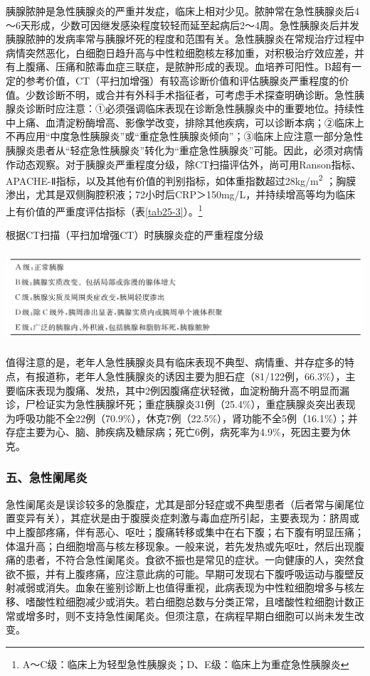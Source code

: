 胰腺脓肿是急性胰腺炎的严重并发症，临床上相对少见。脓肿常在急性胰腺炎后4～6天形成，少数可因继发感染程度较轻而延至起病后2～4周。急性胰腺炎后并发胰腺脓肿的发病率常与胰腺坏死的程度和范围有关。急性胰腺炎在常规治疗过程中病情突然恶化，白细胞日趋升高与中性粒细胞核左移加重，对积极治疗效应差，并有上腹痛、压痛和脓毒血症三联症，是脓肿形成的表现。血培养可阳性。B超有一定的参考价值，CT（平扫加增强）有较高诊断价值和评估胰腺炎严重程度的价值。少数诊断不明，或合并有外科手术指征者，可考虑手术探查明确诊断。急性胰腺炎诊断时应注意：①必须强调临床表现在诊断急性胰腺炎中的重要地位。持续性中上痛、血清淀粉酶增高、影像学改变，排除其他疾病，可以诊断本病；②临床上不再应用“中度急性胰腺炎”或“重症急性胰腺炎倾向”；③临床上应注意一部分急性胰腺炎患者从“轻症急性胰腺炎”转化为“重症急性胰腺炎”可能。因此，必须对病情作动态观察。对于胰腺炎严重程度分级，除CT扫描评估外，尚可用Ranson指标、APACHE-Ⅱ指标，以及其他有价值的判别指标，如体重指数超过28kg/m\textsuperscript{2}
；胸膜渗出，尤其是双侧胸腔积液；72小时后CRP＞150mg/L，并持续增高等均为临床上有价值的严重度评估指标（表\ref{tab25-3}）。\footnote{A～C级：临床上为轻型急性胰腺炎；D、E级：临床上为重症急性胰腺炎}

\begin{table}[htbp]
\centering
\caption{根据CT扫描（平扫加增强CT）时胰腺炎症的严重程度分级}
\label{tab25-3}
\includegraphics[width=5.95833in,height=1.32292in]{./images/Image00143.jpg}
\end{table}


值得注意的是，老年人急性胰腺炎具有临床表现不典型、病情重、并存症多的特点，有报道称，老年人急性胰腺炎的诱因主要为胆石症（81/122例，66.3\%），主要临床表现为腹痛、发热，其中2例因腹痛症状轻微，血淀粉酶升高不明显而漏诊，尸检证实为急性胰腺坏死；重症胰腺炎31例（25.4\%），重症胰腺炎突出表现为呼吸功能不全22例（70.9\%），休克7例（22.5\%），肾功能不全5例（16.1\%）；并存症主要为心、脑、肺疾病及糖尿病；死亡6例，病死率为4.9\%，死因主要为休克。

\subsubsection{五、急性阑尾炎}

急性阑尾炎是误诊较多的急腹症，尤其是部分轻症或不典型患者（后者常与阑尾位置变异有关），其症状是由于腹膜炎症刺激与毒血症所引起，主要表现为：脐周或中上腹部疼痛，伴有恶心、呕吐；腹痛转移或集中在右下腹；右下腹有明显压痛；体温升高；白细胞增高与核左移现象。一般来说，若先发热或先呕吐，然后出现腹痛的患者，不符合急性阑尾炎。食欲不振也是常见的症状。一向健康的人，突然食欲不振，并有上腹疼痛，应注意此病的可能。早期可发现右下腹呼吸运动与腹壁反射减弱或消失。血象在鉴别诊断上也值得重视，此病表现为中性粒细胞增多与核左移、嗜酸性粒细胞减少或消失。若白细胞总数与分类正常，且嗜酸性粒细胞计数正常或增多时，则不支持急性阑尾炎。但须注意，在病程早期白细胞可以尚未发生改变。

